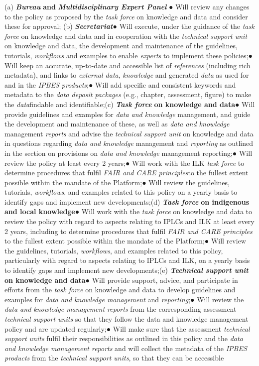 \documentclass{article}
\begin{document}
(a) \textit{\textbf{Bureau }}\textbf{and }\textit{\textbf{Multidisciplinary Expert Panel}}
● Will review any changes to the policy as proposed by the \textit{task force} on knowledge and data and consider these for approval; (b) \textit{\textbf{Secretariat}}\n ● Will execute, under the guidance of the \textit{task force }on knowledge and data and in cooperation with the \textit{technical support unit} on knowledge and data, the development and maintenance of the guidelines, tutorials, \textit{workflows} and examples to enable \textit{experts} to implement these policies;● Will keep an accurate, up-to-date and accessible list of \textit{references} (including rich metadata), and links to \textit{external data}, \textit{knowledge }and generated \textit{data} as used for and in the \textit{IPBES products};● Will add specific and consistent keywords and metadata to the \textit{data deposit packages} (e.g., chapter, assessment, figure) to make the \textit{data}findable and identifiable;(c) \textit{\textbf{Task force}}\textbf{ on knowledge and data}● Will provide guidelines and examples for \textit{data and knowledge }management\textit{, }and guide the development and maintenance of these, as well as \textit{data and knowledge }management \textit{reports} and advise the \textit{technical support unit} on knowledge and data in questions regarding \textit{data and knowledge }management and\textit{ reporting} as outlined in the section on provisions on \textit{data and knowledge} management reporting;● Will review the policy at least every 2 years;● Will work with the ILK \textit{task force }to determine procedures that fulfil \textit{FAIR and CARE principles}to the fullest extent possible within the mandate of the Platform;● Will review the guidelines, tutorials, \textit{workflows}, and examples related to this policy on a yearly basis to identify gaps and implement new developments;(d) \textit{\textbf{Task force}}\textbf{ on indigenous and local knowledge}● Will work with the \textit{task force} on knowledge and data to review the policy with regard to aspects relating to IPLCs and ILK at least every 2 years, including to determine procedures that fulfil \textit{FAIR and CARE principles} to the fullest extent possible within the mandate of the Platform;● Will review the guidelines, tutorials, \textit{workflows}, and examples related to this policy, particularly with regard to aspects relating to IPLCs and ILK, on a yearly basis to identify gaps and implement new developments;(e) \textit{\textbf{Technical support unit}}\textbf{ on knowledge and data}● Will provide support, advice, and participate in efforts from the \textit{task force }on knowledge and data to develop guidelines and examples for \textit{data and knowledge management} and \textit{reporting};● Will review the\textit{ data and knowledge management reports} from the corresponding assessment \textit{technical support units }so that they follow the data and knowledge management policy and are updated regularly;● Will make sure that the assessment \textit{technical support units} fulfil their responsibilities as outlined in this policy and the \textit{data and knowledge management reports} and will collect the metadata of the \textit{IPBES products }from the \textit{technical support units}, so that they can be accessible 
\end{document}
